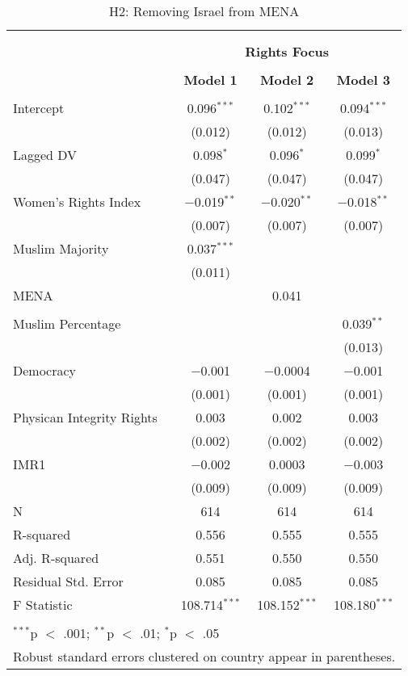 
\begin{table}[!htbp] \centering 
  \caption{H2: Removing Israel from MENA} 
  \label{} 
\begin{tabular}{@{\extracolsep{5pt}}lccc} 
\\[-1.8ex]\hline \\[-1.8ex] 
\\[-1.8ex] & \multicolumn{3}{c}{\textbf{Rights Focus}} \\ 
\\[-1.8ex] & \textbf{Model 1} & \textbf{Model 2} & \textbf{Model 3}\\ 
\hline \\[-1.8ex] 
 Intercept & 0.096$^{***}$ & 0.102$^{***}$ & 0.094$^{***}$ \\ 
  & (0.012) & (0.012) & (0.013) \\ 
  Lagged DV & 0.098$^{*}$ & 0.096$^{*}$ & 0.099$^{*}$ \\ 
  & (0.047) & (0.047) & (0.047) \\ 
  Women's Rights Index & $-$0.019$^{**}$ & $-$0.020$^{**}$ & $-$0.018$^{**}$ \\ 
  & (0.007) & (0.007) & (0.007) \\ 
  Muslim Majority & 0.037$^{***}$ &  &  \\ 
  & (0.011) &  &  \\ 
  MENA &  & 0.041 &  \\ 
  &  &  &  \\ 
  Muslim Percentage &  &  & 0.039$^{**}$ \\ 
  &  &  & (0.013) \\ 
  Democracy & $-$0.001 & $-$0.0004 & $-$0.001 \\ 
  & (0.001) & (0.001) & (0.001) \\ 
  Physican Integrity Rights & 0.003 & 0.002 & 0.003 \\ 
  & (0.002) & (0.002) & (0.002) \\ 
  IMR1 & $-$0.002 & 0.0003 & $-$0.003 \\ 
  & (0.009) & (0.009) & (0.009) \\ 
 N & 614 & 614 & 614 \\ 
R-squared & 0.556 & 0.555 & 0.555 \\ 
Adj. R-squared & 0.551 & 0.550 & 0.550 \\ 
Residual Std. Error & 0.085 & 0.085 & 0.085 \\ 
F Statistic & 108.714$^{***}$ & 108.152$^{***}$ & 108.180$^{***}$ \\ 
\hline \\[-1.8ex] 
\multicolumn{4}{l}{$^{***}$p $<$ .001; $^{**}$p $<$ .01; $^{*}$p $<$ .05} \\ 
\multicolumn{4}{l}{Robust standard errors clustered on country appear in parentheses.} \\ 
\end{tabular} 
\end{table} 
